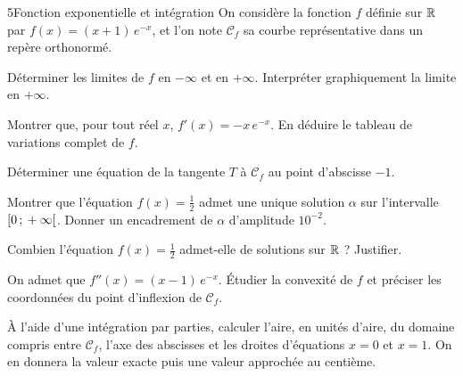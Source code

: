 \begin{exoBac}{5}{Fonction exponentielle et intégration}
On considère la fonction $f$ définie sur $\mathbb{R}$ par $f(x)=(x+1)\,e^{-x}$, et l'on note $\mathcal{C}_f$ sa courbe représentative dans un
repère orthonormé.

\begin{questions}
  \item Déterminer les limites de $f$ en $-\infty$ et en $+\infty$. Interpréter graphiquement la limite en $+\infty$.
  \item Montrer que, pour tout réel $x$, $f'(x)=-x\,e^{-x}$. En déduire le tableau de variations complet de $f$.
  \item Déterminer une équation de la tangente $T$ à $\mathcal{C}_f$ au point d'abscisse $-1$.
\end{questions}

\begin{questions}[resume]
  \item Montrer que l'équation $f(x)=\frac12$ admet une unique solution $\alpha$ sur l'intervalle $\mathopen{[}0\,{;}\,+\infty\mathclose{[}$. Donner un
    encadrement de $\alpha$ d'amplitude $10^{-2}$.
  \item Combien l'équation $f(x)=\frac12$ admet-elle de solutions sur $\mathbb{R}$ ? Justifier.
\end{questions}

\begin{questions}[resume]
  \item On admet que $f''(x)=(x-1)\,e^{-x}$. Étudier la convexité de $f$ et préciser les coordonnées du point d'inflexion de $\mathcal{C}_f$.
  \item À l'aide d'une intégration par parties, calculer l'aire, en unités d'aire, du domaine compris entre $\mathcal{C}_f$, l'axe des
    abscisses et les droites d'équations $x=0$ et $x=1$. On en donnera la valeur exacte puis une valeur approchée au centième.
\end{questions}
\end{exoBac}

